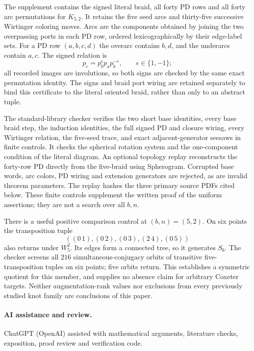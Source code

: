 \documentclass[11pt]{article}
\begin{document}
The supplement
 contains the signed
literal braid, all forty PD rows and all forty arc permutations for
$K_{5,2}$. It retains the five seed arcs and thirty-five successive
Wirtinger coloring moves. Arcs are the components obtained by joining
the two overpassing ports in each PD row, ordered lexicographically by
their edge-label sets. For a PD row $(a,b,c,d)$ the overarc contains
$b,d$, and the underarcs contain $a,c$. The signed relation is
\[
 p_c=p_b^{\epsilon}p_a p_b^{-\epsilon},\qquad\epsilon\in\{1,-1\};
\]
all recorded images are involutions, so both signs are checked by the
same exact permutation identity. The signs and braid port wiring are
retained separately to bind this certificate to the literal oriented
braid, rather than only to an abstract tuple.

The standard-library checker
 verifies the two
short base identities, every base braid step, the induction identities,
the full signed PD and closure wiring, every Wirtinger relation, the
five-seed trace, and exact adjacent-generator seesaws in finite controls.
It checks the spherical rotation system and the one-component condition
of the literal diagram. An optional topology replay reconstructs the
forty-row PD directly from the five-braid using Spherogram. Corrupted
base words, arc colors, PD wiring and extension generators are rejected,
as are invalid theorem parameters. The replay hashes the three primary
source PDFs cited below. These finite controls supplement the written
proof of the uniform assertions; they are not a search over all $b,n$.

There is a useful positive comparison control at $(b,n)=(5,2)$.
On six points the transposition tuple
\[
 ((0\,1),(0\,2),(0\,3),(2\,4),(0\,5))
\]
also returns under $W_5^2$. Its edges form a connected tree, so it
generates $S_6$. The checker screens all $216$ simultaneous-conjugacy
orbits of transitive five-transposition tuples on six points; five
orbits return. This establishes a symmetric quotient for this member,
and supplies no absence claim for arbitrary Coxeter targets. Neither
augmentation-rank values nor exclusions from every previously studied
knot family are conclusions of this paper.

\paragraph{AI assistance and review.}
ChatGPT (OpenAI) assisted with mathematical arguments, literature checks,
exposition, proof review and verification code.
\end{document}
